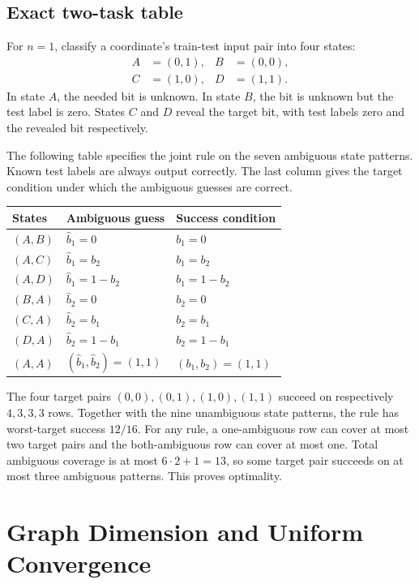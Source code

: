 \documentclass[twoside]{article}
\begin{document}
\subsection{Exact two-task table}

For $n=1$, classify a coordinate's train-test input pair into four states:
\[
\begin{aligned}
A&=(0,1),& B&=(0,0),\\
C&=(1,0),& D&=(1,1).
\end{aligned}
\]
In state $A$, the needed bit is unknown. In state $B$, the bit is unknown but the test label is zero. States $C$ and $D$ reveal the target bit, with test labels zero and the revealed bit respectively.

The following table specifies the joint rule on the seven ambiguous state patterns. Known test labels are always output correctly. The last column gives the target condition under which the ambiguous guesses are correct.

\begin{table}[h]
\centering
\small
\begin{tabular}{@{}lll@{}}
\toprule
States & Ambiguous guess & Success condition \\
\midrule
$(A,B)$ & $\widehat b_1=0$ & $b_1=0$ \\
$(A,C)$ & $\widehat b_1=b_2$ & $b_1=b_2$ \\
$(A,D)$ & $\widehat b_1=1-b_2$ & $b_1=1-b_2$ \\
$(B,A)$ & $\widehat b_2=0$ & $b_2=0$ \\
$(C,A)$ & $\widehat b_2=b_1$ & $b_2=b_1$ \\
$(D,A)$ & $\widehat b_2=1-b_1$ & $b_2=1-b_1$ \\
$(A,A)$ & $(\widehat b_1,\widehat b_2)=(1,1)$ & $(b_1,b_2)=(1,1)$ \\
\bottomrule
\end{tabular}
\end{table}

The four target pairs $(0,0),(0,1),(1,0),(1,1)$ succeed on respectively $4,3,3,3$ rows. Together with the nine unambiguous state patterns, the rule has worst-target success $12/16$. For any rule, a one-ambiguous row can cover at most two target pairs and the both-ambiguous row can cover at most one. Total ambiguous coverage is at most $6\cdot2+1=13$, so some target pair succeeds on at most three ambiguous patterns. This proves optimality.

\section{Graph Dimension and Uniform Convergence}
\label{app:graph}
\end{document}
